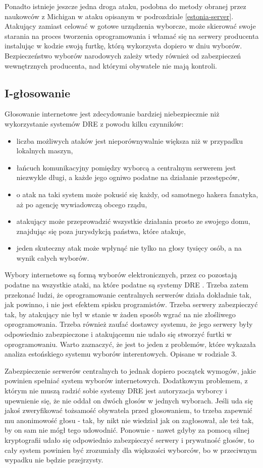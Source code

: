 \documentclass[polish]{kbk}
\begin{document}
Ponadto istnieje jeszcze jedna droga ataku, podobna do metody obranej przez naukowców z Michigan w ataku opisanym w podrozdziale \ref{estonia-server}. Atakujący zamiast celować w gotowe urządzenia wyborcze, może skierować swoje starania na proces tworzenia oprogramowania i włamać się na serwery producenta instalując w kodzie swoją furtkę, którą wykorzysta dopiero w dniu wyborów. Bezpieczeństwo wyborów narodowych zależy wtedy również od zabezpieczeń wewnętrznych producenta, nad którymi obywatele nie mają kontroli.

\subsection{I-głosowanie}
Głosowanie internetowe jest zdecydowanie bardziej niebezpiecznie niż wykorzystanie systemów DRE z powodu kilku czynników:
\begin{itemize}
\item liczba możliwych ataków jest nieporównywalnie większa niż w przypadku lokalnych maszyn,
\item łańcuch komunikacyjny pomiędzy wyborcą a centralnym serwerem jest niezwykle długi, a każde jego ogniwo podatne na działanie przestępców,
\item o atak na taki system może pokusić się każdy, od samotnego hakera fanatyka, aż po agencję wywiadowczą obcego rządu,
\item atakujący może przeprowadzić wszystkie działania prosto ze swojego domu, znajdując się poza jurysdykcją państwa, które atakuje,
\item jeden skuteczny atak może wpłynąć nie tylko na głosy tysięcy osób, a na wynik całych wyborów.
\end{itemize}

Wybory internetowe są formą wyborów elektronicznych, przez co pozostają podatne na wszystkie ataki, na które podatne są systemy DRE \cite{google}. Trzeba zatem przekonać ludzi, że oprogramowanie centralnych serwerów działa dokładnie tak, jak powinno, i nie jest efektem spisku programistów. Trzeba serwery zabezpieczyć tak, by atakujący nie był w stanie w żaden sposób wgrać na nie złośliwego oprogramowania.  Trzeba również zaufać dostawcy systemu, że jego serwery były odpowiednio zabezpieczone i atakującemu nie udało się stworzyć furtki w oprogramowaniu. Warto zaznaczyć, że jest to jeden z problemów, które wykazała analiza estońskiego systemu wyborów interentowych. Opisane w rodziale 3.

Zabezpieczenie serwerów centralnych to jednak dopiero początek wymogów, jakie powinien spełniać system wyborów internetowych. Dodatkowym problemem, z którym nie muszą radzić sobie systemy DRE jest autoryzacja wyborcy i upewnienie się, że nie oddał on dwóch głosów w jednych wyborach. Jeśli uda się jakoś zweryfikować tożsamość obywatela przed głosowaniem, to trzeba zapewnić mu anonimowość głosu - tak, by nikt nie wiedział jak on zagłosował, ale też tak, by on sam nie mógł tego udowodnić. Ponownie - nawet gdyby za pomocą silnej kryptografii udało się odpowiednio zabezpieczyć serwery i prywatność głosów, to cały system powinien być zrozumiały dla większości wyborców, bo w przeciwnym wypadku nie będzie przejrzysty.
\end{document}
